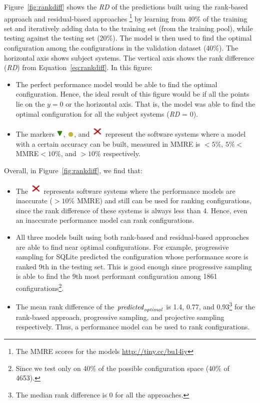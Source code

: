 \documentclass[sigconf]{acmart}
\newcommand{\custriangle}{\includegraphics[scale=0.5]{Figures/upsidedown.png}}
\newcommand{\cuscross}{\includegraphics[scale=0.4]{Figures/cross.png}}
\newcommand{\cusdot}{\includegraphics[scale=0.5]{Figures/dot.png}}
\begin{document}
Figure~\ref{fig:rankdiff} shows the \textit{RD} of the predictions built using the rank-based approach and residual-based approaches \footnote{The MMRE scores for the models \url{http://tiny.cc/bu14iy}} by learning from 40\% of the training set and iteratively adding data to the training set (from the training pool), while testing against the testing set (20\%). The model is then used to find the optimal configuration among the configurations in the validation dataset (40\%). The horizontal axis shows subject systems. The vertical axis shows the rank difference (\textit{RD}) from Equation~\ref{eq:rankdiff}. In this figure:
\begin{itemize}
    \item The perfect performance model would be able to find the optimal configuration. Hence, the ideal result of this figure would be if all the points lie on the $y=0$ or the horizontal axis. That is, the model was able to find the optimal configuration for all the subject systems (\textit{RD} = 0). 
    \item The markers \protect\custriangle{}, \protect\cusdot{}, and \protect\cuscross{} represent the software systems where  a  model with a certain accuracy can be built, measured in MMRE is  $<5\%$, $5\%<$MMRE$<10\%$, and $>10\%$ respectively.
\end{itemize}



Overall, in Figure~\ref{fig:rankdiff}, we find that:
\begin{itemize}
    \item The \cuscross{} represents software systems where the performance models are inaccurate ($>10\%$ MMRE) and still can be used for ranking configurations, since the rank difference of these systems is always less than 4. Hence, even an inaccurate performance model can rank configurations.
    \item All three models built using both rank-based and residual-based approaches are able to find near optimal configurations. For example, progressive sampling for SQLite predicted the configuration whose performance score is ranked 9th in the testing set. This is good enough since progressive sampling is able to find the 9th most performant configuration among 1861 configurations\footnote{Since we test only on 40\% of the possible configuration space (40\% of 4653).}.
    \item The mean rank difference of the $\mathit{predicted}_{\mathit{\small{optimal}}}$ is 1.4, 0.77, and 0.93\footnote{The median rank difference is 0 for all the approaches.} for the rank-based approach, progressive sampling, and projective sampling respectively. Thus, a performance model can be used to rank configurations.
\end{itemize}
\end{document}
